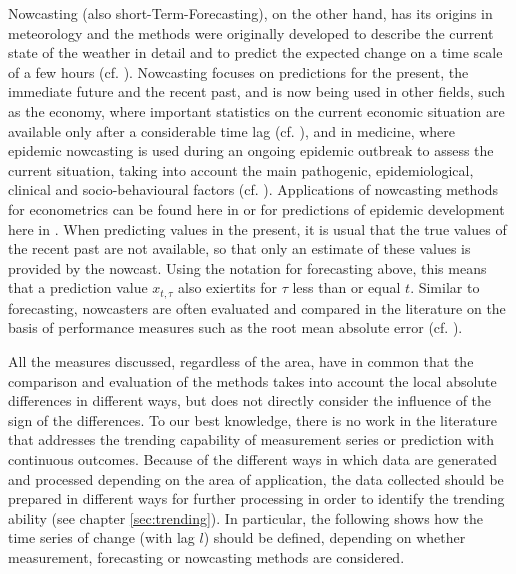 Nowcasting (also short-Term-Forecasting), on the other hand, has its origins in meteorology and the methods were originally developed to describe the current state of the weather in detail and to predict the expected change on a time scale of a few hours (cf. \cite{browning1989nowcasting,schmid2019nowcasting}). Nowcasting focuses on predictions for the present, the immediate future and the recent past, and is now being used in other fields, such as the economy, where important statistics on the current economic situation are available only after a considerable time lag (cf. \cite{banbura2013now}), and in medicine, where epidemic nowcasting is used during an ongoing epidemic outbreak to assess the current situation, taking into account the main pathogenic, epidemiological, clinical and socio-behavioural factors (cf. \cite{wu2021nowcasting}). Applications of nowcasting methods for econometrics can be found here in \cite{giannone2006nowcasting,fornaro2020nowcasting,bok2018macroeconomic} or for predictions of epidemic development here in \cite{johansson2014nowcasting,gunther2021nowcasting,birrell2021real}. When predicting values in the present, it is usual that the true values of the recent past are not available, so that only an estimate of these values is provided by the nowcast. Using the notation for forecasting above, this means that a prediction value $x_{t,\tau}$ also exiertits for $\tau$ less than or equal $t$. Similar to forecasting, nowcasters are often evaluated and  compared in the literature on the basis of performance measures such as the root mean absolute error (cf. \cite{gunther2021nowcasting}).

All the measures discussed, regardless of the area, have in common that the comparison and evaluation of the methods takes into account the local absolute differences in different ways, but does not directly consider the influence of the sign of the differences. To our best knowledge, there is no work in the literature that addresses the trending capability of measurement series or prediction with continuous outcomes. Because of the different ways in which data are generated and processed depending on the area of application, the data collected should be prepared in different ways for further processing in order to identify the trending ability (see chapter \ref{sec:trending}). In particular, the following shows how the time series of change (with lag $l$) should be defined, depending on whether measurement, forecasting or nowcasting methods are considered.

